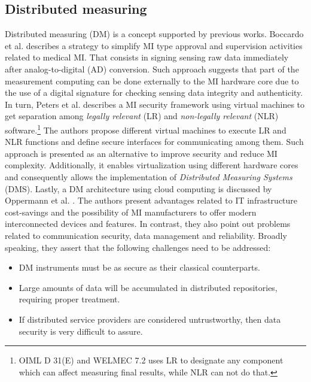 \documentclass[journal]{IEEEtran} %
\begin{document}
\subsection{Distributed measuring}
Distributed measuring (DM) is a concept supported by previous works. Boccardo et al. \cite{Boccardo2014} describes a strategy to simplify MI type approval and supervision activities related to medical MI. That consists in signing sensing raw data immediately after analog-to-digital (AD) conversion. Such approach suggests that part of the measurement computing can be done externally to the MI hardware core due to the use of a digital signature for checking sensing data integrity and authenticity. In turn, Peters et al. \cite{Peters2015} describes a MI security framework using virtual machines to get separation among \emph{legally relevant} (LR) and \emph{non-legally relevant} (NLR) software.\footnote{OIML D 31(E) and WELMEC 7.2 uses LR to designate any component which can affect measuring final results, while NLR can not do that.} The authors propose different virtual machines to execute LR and NLR functions and define secure interfaces for communicating among them. Such approach is presented as an alternative to improve security and reduce MI complexity. Additionally, it enables virtualization using different hardware cores and consequently allows the implementation of \emph{Distributed Measuring Systems} (DMS). Lastly, a DM architecture using cloud computing is discussed by Oppermann et al. \cite{Oppermann2016}. The authors present advantages related to IT infrastructure cost-savings and the possibility of MI manufacturers to offer modern interconnected devices and features. In contrast, they also point out problems related to communication security, data management and reliability. Broadly speaking, they assert that the following challenges need to be addressed:
 \begin{itemize} 
 \item DM instruments must be as secure as their classical counterparts.
 \item Large amounts of data will be accumulated in distributed repositories, requiring proper treatment.
 \item If distributed service providers are considered untrustworthy, then data security is very difficult to assure. 
 \end{itemize} 
\end{document}
